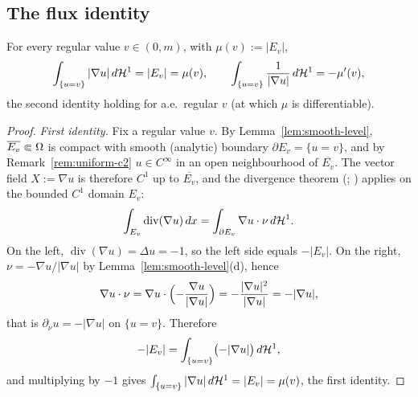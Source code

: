 \subsection*{The flux identity}

\begin{lemma}\label{lem:flux}
For every regular value $v\in(0,m)$, with $\mu(v):=|E_v|$,
\[
  \int_{\{u=v\}}|\nabla u|\,d\mathcal{H}^1=|E_v|=\mu(v),
  \qquad
  \int_{\{u=v\}}\frac{1}{|\nabla u|}\,d\mathcal{H}^1=-\mu'(v),
\]
the second identity holding for a.e.\ regular $v$ (at which $\mu$ is
differentiable).
\end{lemma}

\begin{proof}
\emph{First identity.}
Fix a regular value $v$. By Lemma~\ref{lem:smooth-level}, $\overline{E_v}\Subset\Omega$
is compact with smooth (analytic) boundary $\partial E_v=\{u=v\}$, and by
Remark~\ref{rem:uniform-c2} $u\in C^\infty$ in an open neighbourhood of
$\overline{E_v}$. The vector field $X:=\nabla u$ is therefore $C^1$ up to
$\overline{E_v}$, and the divergence theorem
(\cite[\S4 and the Gauss--Green theorem]{EvansGariepy2015};
\cite[(2.10)--(2.11)]{GT1983}) applies on the bounded $C^1$
domain $E_v$:
\[
  \int_{E_v}\operatorname{div}(\nabla u)\,dx
  =\int_{\partial E_v}\nabla u\cdot\nu\,d\mathcal{H}^1 .
\]
On the left, $\operatorname{div}(\nabla u)=\Delta u=-1$, so the left side equals
$-|E_v|$. On the right, $\nu=-\nabla u/|\nabla u|$ by
Lemma~\ref{lem:smooth-level}(d), hence
\[
  \nabla u\cdot\nu=\nabla u\cdot\Bigl(-\frac{\nabla u}{|\nabla u|}\Bigr)
  =-\frac{|\nabla u|^2}{|\nabla u|}=-|\nabla u|,
\]
that is $\partial_\nu u=-|\nabla u|$ on $\{u=v\}$. Therefore
\[
  -|E_v|=\int_{\{u=v\}}\bigl(-|\nabla u|\bigr)\,d\mathcal{H}^1,
\]
and multiplying by $-1$ gives
$\int_{\{u=v\}}|\nabla u|\,d\mathcal{H}^1=|E_v|=\mu(v)$, the first identity.


\end{proof}
